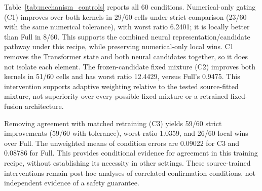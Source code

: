 Table~\ref{tab:mechanism_controls} reports all 60 conditions. Numerical-only gating (C1) improves over both kernels in 29/60 cells under strict comparison (23/60 with the same numerical tolerance), with worst ratio 6.2401; it is locally better than Full in 8/60. This supports the combined neural representation/candidate pathway under this recipe, while preserving numerical-only local wins. C1 removes the Transformer state and both neural candidates together, so it does not isolate each element. The frozen-candidate fixed mixture (C2) improves both kernels in 51/60 cells and has worst ratio 12.4429, versus Full's 0.9475. This intervention supports adaptive weighting relative to the tested source-fitted mixture, not superiority over every possible fixed mixture or a retrained fixed-fusion architecture.

Removing agreement with matched retraining (C3) yields 59/60 strict improvements (59/60 with tolerance), worst ratio 1.0359, and 26/60 local wins over Full. The unweighted means of condition errors are 0.09022 for C3 and 0.08786 for Full. This provides conditional evidence for agreement in this training recipe, without establishing its necessity in other settings. These source-trained interventions remain post-hoc analyses of correlated confirmation conditions, not independent evidence of a safety guarantee.
